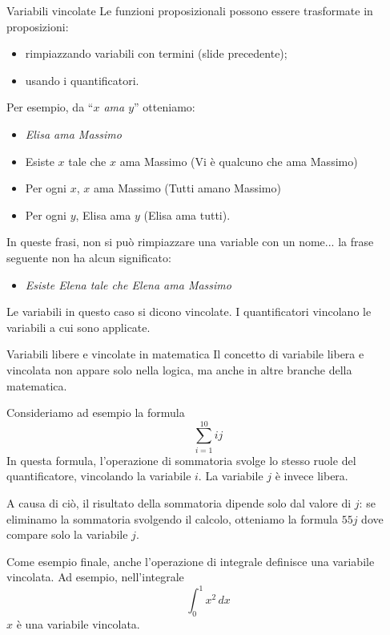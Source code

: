 \documentclass[aspectratio=169,10pt,dvipsnames,handout]{beamer}
\begin{document}
\begin{frame}{Variabili vincolate}
	Le funzioni proposizionali possono essere trasformate in proposizioni:
	\begin{itemize}
		\item rimpiazzando variabili con termini (slide precedente);
		\item usando i quantificatori.
	\end{itemize}
	Per esempio, da  ``{\itshape $x$ ama $y$}'' otteniamo:
	{\itshape
	\begin{itemize}
		\item \itshape Elisa ama Massimo\\
		\item Esiste $x$ tale che $x$ ama Massimo (Vi è qualcuno che ama Massimo)\\
		\item Per ogni $x$, $x$ ama Massimo (Tutti amano Massimo)\\
		\item Per ogni $y$, Elisa ama $y$ (Elisa ama tutti).
	\end{itemize}
	}
	In queste frasi, non si può rimpiazzare una variable con un nome... la frase seguente non ha alcun significato:
	\begin{itemize}
	\item {\itshape Esiste Elena tale che Elena ama Massimo}\\
	\end{itemize}
	Le variabili in questo caso si dicono \alert{vincolate}. I quantificatori \alert{vincolano} le variabili a cui sono applicate.
\end{frame}

\begin{frame}{Variabili libere e vincolate in matematica}
	Il concetto di variabile libera e vincolata non appare solo nella logica, ma anche in altre branche della matematica.

	\medskip Consideriamo ad esempio la formula
	\[
		\sum_{i=1}^{10} ij
	\]
	In questa formula, l'operazione di sommatoria svolge lo stesso ruole del quantificatore, vincolando la variabile $i$. La variabile $j$ è invece libera.

	\medskip
	A causa di ciò, il risultato della sommatoria dipende solo dal valore di $j$: se eliminamo la sommatoria svolgendo il calcolo, otteniamo la formula $55 j$ dove compare solo la variabile $j$.

	\medskip
	Come esempio finale, anche l'operazione di integrale definisce una variabile vincolata. Ad esempio, nell'integrale
	\[
		\int_0^1 x^2 \, dx
	\]
	$x$ è una variabile vincolata.
\end{frame}
\end{document}
